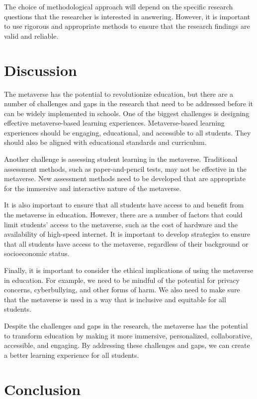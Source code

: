 \documentclass[12pt]{extarticle}
\begin{document}
The choice of methodological approach will depend on the specific research questions that the researcher is interested in answering. However, it is important to use rigorous and appropriate methods to ensure that the research findings are valid and reliable.


\section{Discussion}
The metaverse has the potential to revolutionize education, but there are a number of challenges and gaps in the research that need to be addressed before it can be widely implemented in schools. One of the biggest challenges is designing effective metaverse-based learning experiences. Metaverse-based learning experiences should be engaging, educational, and accessible to all students. They should also be aligned with educational standards and curriculum.

Another challenge is assessing student learning in the metaverse. Traditional assessment methods, such as paper-and-pencil tests, may not be effective in the metaverse. New assessment methods need to be developed that are appropriate for the immersive and interactive nature of the metaverse.

It is also important to ensure that all students have access to and benefit from the metaverse in education. However, there are a number of factors that could limit students' access to the metaverse, such as the cost of hardware and the availability of high-speed internet. It is important to develop strategies to ensure that all students have access to the metaverse, regardless of their background or socioeconomic status.

Finally, it is important to consider the ethical implications of using the metaverse in education. For example, we need to be mindful of the potential for privacy concerns, cyberbullying, and other forms of harm. We also need to make sure that the metaverse is used in a way that is inclusive and equitable for all students.

Despite the challenges and gaps in the research, the metaverse has the potential to transform education by making it more immersive, personalized, collaborative, accessible, and engaging. By addressing these challenges and gaps, we can create a better learning experience for all students.

\section{Conclusion}
\end{document}
